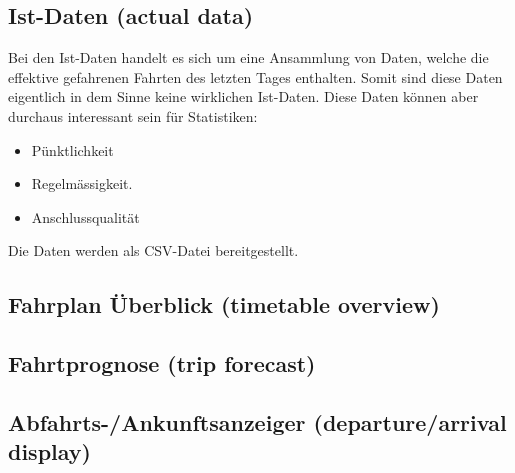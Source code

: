 \documentclass[a4paper,12pt]{scrartcl}
\begin{document}
\subsection{Ist-Daten (actual data)}
\label{sec:istdaten}
Bei den Ist-Daten handelt es sich um eine Ansammlung von Daten, welche die effektive gefahrenen Fahrten des letzten Tages enthalten. Somit sind diese Daten eigentlich in dem Sinne keine wirklichen Ist-Daten. Diese Daten können aber durchaus interessant sein für Statistiken:\cite{istdaten}
\begin{itemize}
	\item{Pünktlichkeit}   
	\item{Regelmässigkeit}. 
	\item{Anschlussqualität}  
\end{itemize}
Die Daten werden als CSV-Datei bereitgestellt.

\subsection{Fahrplan Überblick (timetable overview)}


\subsection{Fahrtprognose (trip forecast)}


\subsection{Abfahrts-/Ankunftsanzeiger (departure/arrival display)}
\end{document}

